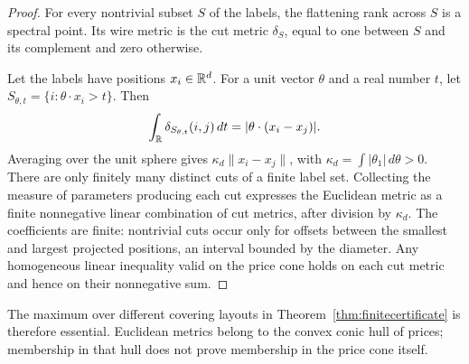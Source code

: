 \begin{proof}
For every nontrivial subset $S$ of the labels, the flattening rank
across $S$ is a spectral point. Its wire metric is the cut metric
$\delta_S$, equal to one between $S$ and its complement and zero
otherwise.

Let the labels have positions $x_i\in\mathbb R^d$. For a unit vector
$\theta$ and a real number $t$, let
$S_{\theta,t}=\{i:\theta\cdot x_i>t\}$. Then
\[
 \int_{\mathbb R}\delta_{S_{\theta,t}}(i,j)\,dt
       =|\theta\cdot(x_i-x_j)|.
\]
Averaging over the unit sphere gives
$\kappa_d\|x_i-x_j\|$, with
$\kappa_d=\int|\theta_1|\,d\theta>0$.
There are only finitely many distinct cuts of a finite label set.
Collecting the measure of parameters producing each cut expresses
the Euclidean metric as a finite nonnegative linear combination
of cut metrics, after division by $\kappa_d$.
The coefficients are finite: nontrivial cuts occur only for offsets
between the smallest and largest projected positions, an interval
bounded by the diameter.
Any homogeneous linear inequality valid on the price cone holds
on each cut metric and hence on their nonnegative sum.
\end{proof}

The maximum over different covering layouts in
Theorem~\ref{thm:finitecertificate} is therefore essential.
Euclidean metrics belong to the convex conic hull of prices;
membership in that hull does not prove membership in the price
cone itself.
